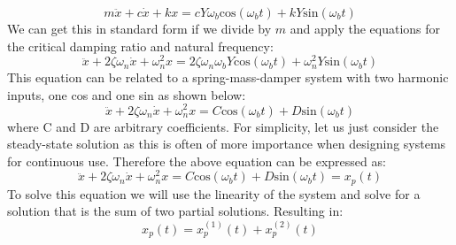 \documentclass[12pt,letter]{article}
\numberwithin{ex}{section} %
\numberwithin{re}{section} %
\begin{document}
\begin{equation}
m\ddot{x} + c\dot{x} + kx = c Y \omega_b \text{cos}(\omega_b t)  + k Y\text{sin}(\omega_b t)  
\end{equation}
We can get this in standard form if we divide by $m$ and apply the equations for the critical damping ratio and natural frequency:
\begin{equation}
\ddot{x} + 2 \zeta \omega_n \dot{x} + \omega_n^2x = 2 \zeta \omega_n \omega_b Y \text{cos}(\omega_b t)  + \omega_n^2 Y\text{sin}(\omega_b t)  
\end{equation}
This equation can be related to a spring-mass-damper system with two harmonic inputs, one cos and one sin as shown below:
\begin{equation}
\ddot{x} + 2 \zeta \omega_n \dot{x} + \omega_n^2x = C \text{cos}(\omega_b t)  + D \text{sin}(\omega_b t)  
\end{equation}
where C and D are arbitrary coefficients. For simplicity, let us just consider the steady-state solution as this is often of more importance when designing systems for continuous use. Therefore the above equation can be expressed as:
\begin{equation}
\ddot{x} + 2 \zeta \omega_n \dot{x} + \omega_n^2x = C \text{cos}(\omega_b t)  + D \text{sin}(\omega_b t)  = x_p(t) 
\end{equation}
To solve this equation we will use the linearity of the system and solve for a solution that is the sum of two partial solutions. Resulting in:
\begin{equation}
 x_p(t) = 	x_p^{(1)}(t) + 	x_p^{(2)}(t)  
\end{equation}
\end{document}
